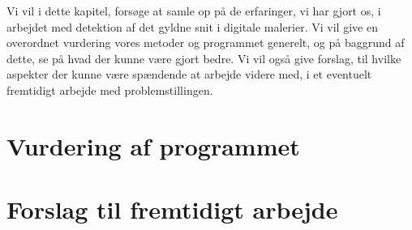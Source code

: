 {
{\sffamily Vi vil i dette kapitel, forsøge at samle op på de erfaringer,
vi har gjort os, i arbejdet med detektion af det gyldne snit i digitale
malerier. Vi vil give en overordnet vurdering vores metoder og
programmet generelt, og på baggrund af dette, se på hvad der kunne være
gjort bedre. Vi vil også give forslag, til hvilke aspekter der kunne
være spændende at arbejde videre med, i et eventuelt fremtidigt arbejde
med problemstillingen.
}

\section{Vurdering af programmet}


\section{Forslag til fremtidigt arbejde}


}

